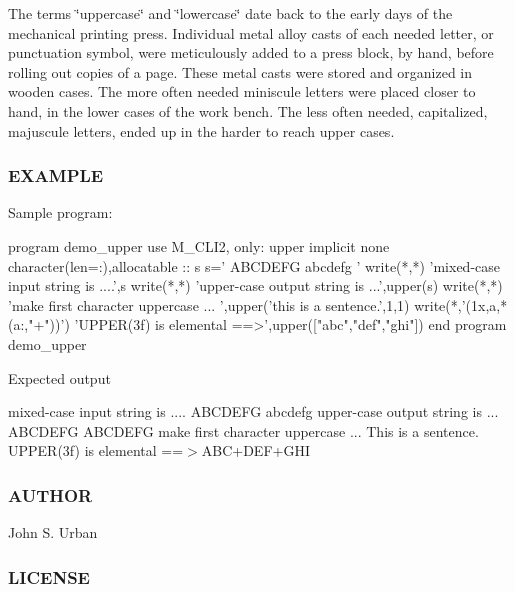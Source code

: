The terms \char`\"{}uppercase\char`\"{} and \char`\"{}lowercase\char`\"{} date back to the early days of the mechanical printing press. Individual metal alloy casts of each needed letter, or punctuation symbol, were meticulously added to a press block, by hand, before rolling out copies of a page. These metal casts were stored and organized in wooden cases. The more often needed miniscule letters were placed closer to hand, in the lower cases of the work bench. The less often needed, capitalized, majuscule letters, ended up in the harder to reach upper cases.

\subsubsection*{E\+X\+A\+M\+P\+LE}

Sample program\+: \begin{DoxyVerb}program demo_upper
use M_CLI2, only: upper
implicit none
character(len=:),allocatable  :: s
   s=' ABCDEFG abcdefg '
   write(*,*) 'mixed-case input string is ....',s
   write(*,*) 'upper-case output string is ...',upper(s)
   write(*,*) 'make first character uppercase  ... ',upper('this is a sentence.',1,1)
   write(*,'(1x,a,*(a:,"+"))') 'UPPER(3f) is elemental ==>',upper(["abc","def","ghi"])
end program demo_upper
\end{DoxyVerb}


Expected output

mixed-\/case input string is .... A\+B\+C\+D\+E\+FG abcdefg upper-\/case output string is ... A\+B\+C\+D\+E\+FG A\+B\+C\+D\+E\+FG make first character uppercase ... This is a sentence. U\+P\+P\+E\+R(3f) is elemental ==$>$A\+B\+C+\+D\+E\+F+\+G\+HI \subsubsection*{A\+U\+T\+H\+OR}

John S. Urban \subsubsection*{L\+I\+C\+E\+N\+SE}

